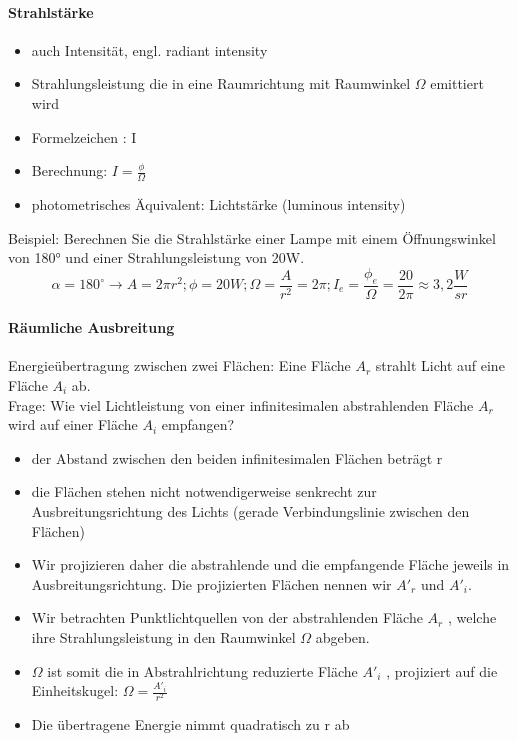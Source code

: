 \documentclass[10pt,landscape]{article}
\begin{document}
\begin{multicols}{3}
\paragraph{Strahlstärke}
\begin{itemize}
  \item auch Intensität, engl. radiant intensity
  \item Strahlungsleistung die in eine Raumrichtung mit Raumwinkel $\Omega$ emittiert wird
  \item Formelzeichen : I
  \item Berechnung: $I=\frac{\phi}{\Omega}$
  \item photometrisches Äquivalent: Lichtstärke (luminous intensity)
\end{itemize}

Beispiel: Berechnen Sie die Strahlstärke einer Lampe mit einem Öffnungswinkel von 180° und einer Strahlungsleistung von 20W.
$$\alpha=180^{\circ}\rightarrow A=2\pi r^2; \phi =20W; \Omega=\frac{A}{r^2}=2\pi ; I_e=\frac{\phi_e}{\Omega}=\frac{20}{2\pi}\approx 3,2 \frac{W}{sr}$$

\paragraph{Räumliche Ausbreitung}
Energieübertragung zwischen zwei Flächen:
Eine Fläche $A_r$ strahlt Licht auf eine Fläche $A_i$ ab.\\
Frage: Wie viel Lichtleistung von einer infinitesimalen abstrahlenden Fläche $A_r$ wird auf einer Fläche $A_i$ empfangen?
\begin{itemize}
  \item der Abstand zwischen den beiden infinitesimalen Flächen beträgt r
  \item die Flächen stehen nicht notwendigerweise senkrecht zur Ausbreitungsrichtung des Lichts (gerade Verbindungslinie zwischen den Flächen)
  \item Wir projizieren daher die abstrahlende und die empfangende Fläche jeweils in Ausbreitungsrichtung. Die projizierten Flächen nennen wir $A'_r$ und $A'_i$.
  \item Wir betrachten Punktlichtquellen von der abstrahlenden Fläche $A_r$ , welche ihre Strahlungsleistung in den Raumwinkel $\Omega$ abgeben.
  \item $\Omega$ ist somit die in Abstrahlrichtung reduzierte Fläche $A'_i$ , projiziert auf die Einheitskugel: $\Omega=\frac{A'_i}{r^2}$
  \item Die übertragene Energie nimmt quadratisch zu r ab
\end{itemize}


\end{multicols}
\end{document}
